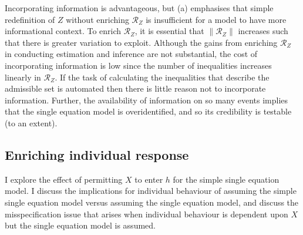 \documentclass[12pt,a4paper,twoside]{article}
\numberwithin{equation}{section}
\begin{document}
Incorporating information is advantageous, but (a) emphasises that simple redefinition of $Z$ without enriching $\mathcal{R}_Z$ is insufficient for a model to have more informational context. To enrich $\mathcal{R}_Z$, it is essential that $\|\mathcal{R}_Z\|$ increases such that there is greater variation to exploit. Although the gains from enriching $\mathcal{R}_Z$ in conducting estimation and inference are not substantial, the cost of incorporating information is low since the number of inequalities increases linearly in $\mathcal{R}_Z$. If the task of calculating the inequalities that describe the admissible set is automated then there is little reason not to incorporate information. Further, the availability of information on so many events implies that the single equation model is overidentified, and so its credibility is testable (to an extent).
\subsection{Enriching individual response}
I explore the effect of permitting $X$ to enter $h$ for the simple single equation model. I discuss the implications for individual behaviour of assuming the simple single equation model versus assuming the single equation model, and discuss the misspecification issue that arises when individual behaviour is dependent upon $X$ but the single equation model is assumed. 
\end{document}
